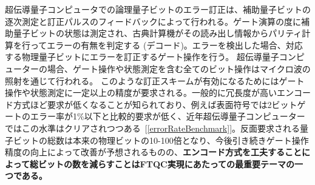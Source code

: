 \documentclass[11pt,a4j,dvipdfmx]{jarticle} 					%
\newcommand{\研究課題名}{誤り耐性量子コンピュータに向けた誤り訂正技術の開発(仮)}
\newcommand{\研究機関名}{東京大学}
\newcommand{\研究代表者氏名}{寺師弘二}
\newcommand{\研究期間の最終元号年度}{10}  %
\newcommand{\mybf}[1]{{\bfseries\sffamily#1}}
\begin{document}
%
超伝導量子コンピュータでの論理量子ビットのエラー訂正は、補助量子ビットの逐次測定と訂正パルスのフィードバックによって行われる。ゲート演算の度に補助量子ビットの状態は測定され、古典計算機がその読み出し情報からパリティ計算を行ってエラーの有無を判定する (デコード)。エラーを検出した場合、対応する物理量子ビットにエラーを訂正するゲート操作を行う。
超伝導量子コンピューターの場合、ゲート操作や状態測定を含む全てのビット操作はマイクロ波の照射を通じて行われる。
このような訂正スキームが有効になるためにはゲート操作や状態測定に一定以上の精度が要求される。一般的に冗長度が高いエンコード方式ほど要求が低くなることが知られており、例えば表面符号では2ビットゲートのエラー率が1\%以下と比較的要求が低く、近年超伝導量子コンピューターではこの水準はクリアされつつある~[\ref{errorRateBenchmark}]。反面要求される量子ビットの総数は本来の物理ビットの10-100倍となり、今後引き続きゲート操作精度の向上によって改善が予想されるものの、\mybf{エンコード方式を工夫することによって総ビットの数を減らすことはFTQC実現にあたっての最重要テーマの一つである。} \\
\end{document}
